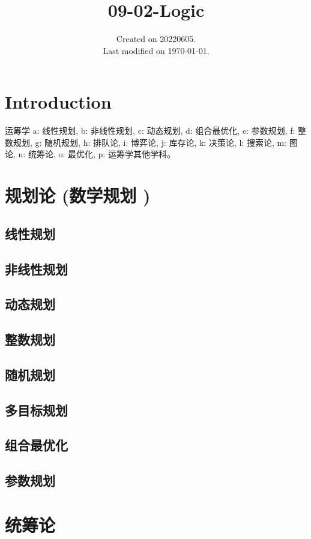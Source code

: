 \documentclass[UTF8]{../09-Mathematics}
\begin{document}
\title{09-02-Logic}
\date{Created on 20220605.\\   Last modified on \today.}
\maketitle
\tableofcontents


\chapter{Introduction}



运筹学
a: 线性规划, 
b: 非线性规划, 
c: 动态规划, 
d: 组合最优化, 
e: 参数规划, 
f: 整数规划, 
g: 随机规划, 
h: 排队论, 
i: 博弈论, 
j: 库存论, 
k: 决策论, 
l: 搜索论, 
m: 图论, 
n: 统筹论, 
o: 最优化, 
p: 运筹学其他学科。


\chapter{规划论 (数学规划 )}
    \section{线性规划}
    \section{非线性规划}
    \section{动态规划}
    \section{整数规划}
    \section{随机规划}
    \section{多目标规划}
    \section{组合最优化}
    \section{参数规划}

\chapter{统筹论}
\end{document}
